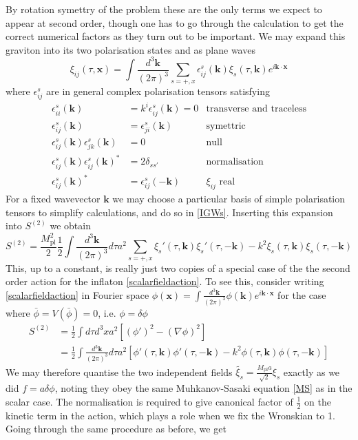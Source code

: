 \documentclass[a4paper,10pt]{article}
\renewcommand{\v}[1]{\mathbf{#1}}
\newcommand{\Mp}{M_{\text{pl}}}
\newcommand{\half}{\frac{1}{2}}
\newcommand{\bphi}{\bar{\phi}}
\newcommand{\fint}[1]{\int \frac{d^3 \v{#1}}{(2\pi)^3}}
\begin{document}
By rotation symettry of the problem these are the only terms we expect to appear at second order, though one has to go through the calculation to get the correct numerical factors as they turn out to be important. We may expand this graviton into its two polarisation states and as plane waves \cite{pajer}
\begin{equation}
\xi_{ij}(\tau, \v{x}) = \fint{k} \sum_{s=+,x} \epsilon_{ij}^s(\v{k})\xi_s(\tau,\v{k})e^{i\v{k}\cdot\v{x}}
\end{equation}
where $\epsilon_{ij}^s$ are in general complex polarisation tensors satisfying
\begin{align}
\epsilon_{ii}^s(\v{k}) &= k^i \epsilon_{ij}^s(\v{k}) = 0 &\text{transverse and traceless}\\
\label{polarisation1}
\epsilon_{ij}^s(\v{k}) &= \epsilon_{ji}^s(\v{k}) &\text{symettric}\\
\epsilon_{ij}^s(\v{k})\epsilon_{jk}^s(\v{k}) &= 0&\text{null}\\
\epsilon_{ij}^s(\v{k})\epsilon_{ij}^s(\v{k})^* &= 2\delta_{ss'} &\text{normalisation}\\
\epsilon_{ij}^s(\v{k})^* &= \epsilon_{ij}^s(\v{-k})&\text{$\xi_{ij}$ real}
\label{polarisation2}
\end{align}
For a fixed wavevector $\v{k}$ we may choose a particular basis of simple polarisation tensors to simplify calculations, and do so in \ref{IGWs}. Inserting this expansion into $S^{(2)}$ we obtain 
\begin{equation}
S^{(2)} = \frac{\Mp^2}{2} \half \fint{k} d\tau a^2 \sum_{s=+,x} \xi_s'(\tau,\v{k})\xi_s '(\tau,\v{-k})-k^2 \xi_s(\tau,\v{k})\xi_s (\tau,\v{-k})
\label{gravwaveaction}
\end{equation}
This, up to a constant, is really just two copies of a special case of the the second order action for the inflaton \ref{scalarfieldaction}. To see this, consider writing \ref{scalarfieldaction} in Fourier space $\phi(\v{x}) = \fint{k} \phi(\v{k})e^{i\v{k}\cdot\v{x}}$ for the case where $\bphi = V(\bphi) = 0$, i.e. $\phi = \delta \phi$
\begin{equation}\begin{split}
S^{(2)} &= \half \int d\tau d^3x a^2 [(\phi ' )^2 -(\nabla \phi)^2]\\
 &= \half \fint{k} d\tau a^2 [\phi'(\tau, \v{k})\phi'(\tau,\v{-k}) - k^2 \phi(\tau,\v{k})\phi(\tau,\v{-k})]
\end{split}\end{equation}
We may therefore quantise the two independent fields $\tilde{\xi_s} = \frac{\Mp a}{\sqrt{2}} \xi_s$ exactly as we did $ f = a \delta \phi$, noting they obey the same Muhkanov-Sasaki equation \ref{MS} as in the scalar case. The normalisation is required to give canonical factor of $\half$ on the kinetic term in the action, which plays a role when we fix the Wronskian to 1. Going through the same procedure as before, we get
\end{document}
